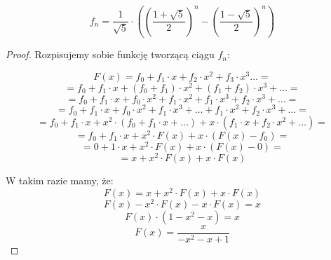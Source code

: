  \begin{theorem}
        \begin{equation}
            f_n = \frac{1}{\sqrt{5}} \cdot \left( \left(\frac{1 + \sqrt{5}}{2}\right)^{n} - \left(\frac{1 - \sqrt{5}}{2}\right)^{n} \right)
        \end{equation}
    \end{theorem}

    \begin{proof}
        Rozpisujemy sobie funkcję tworzącą ciągu $f_n$:

        \begin{equation*}
            F(x) = f_0 + f_1 \cdot x + f_2 \cdot x^2 + f_3 \cdot x^3 \dots = 
        \end{equation*}
        \begin{equation*}
           = f_0 + f_1 \cdot x + (f_0 + f_1) \cdot x^2 + (f_1 + f_2) \cdot x^3 + \dots =
        \end{equation*}
        \begin{equation*}
           = f_0 + f_1 \cdot x + f_0 \cdot x^2 + f_1 \cdot x^2 + f_1 \cdot x^3 + f_2 \cdot x^3 + \dots =
        \end{equation*}
          \begin{equation*}
           = f_0 + f_1 \cdot x + f_0 \cdot x^2 + f_1 \cdot x^3 + \dots + f_1 \cdot x^2 +  f_2 \cdot x^3 + \dots =
        \end{equation*}
         \begin{equation*}
           = f_0 + f_1 \cdot x + x^2 \cdot (f_0 + f_1 \cdot x + \dots) + x \cdot (f_1 \cdot x +  f_2 \cdot x^2 + \dots) =
        \end{equation*}
        \begin{equation*}
           = f_0 + f_1 \cdot x + x^2 \cdot F(x) + x \cdot (F(x) - f_0) =
        \end{equation*}
        \begin{equation*}
           = 0 + 1 \cdot x + x^2 \cdot F(x) + x \cdot (F(x) - 0) =
        \end{equation*}
         \begin{equation*}
           = x + x^2 \cdot F(x) + x \cdot F(x)
        \end{equation*}

        W takim razie mamy, że:
        \begin{equation*}
            F(x) = x + x^2 \cdot F(x) + x \cdot F(x)
        \end{equation*}
        \begin{equation*}
            F(x) -  x^2 \cdot F(x) - x \cdot F(x)  = x
        \end{equation*}
         \begin{equation*}
            F(x) \cdot (1 - x^2 - x) = x
        \end{equation*}
           \begin{equation*}
            F(x) = \frac{x}{-x^2 -x + 1}
        \end{equation*}


\end{proof}
